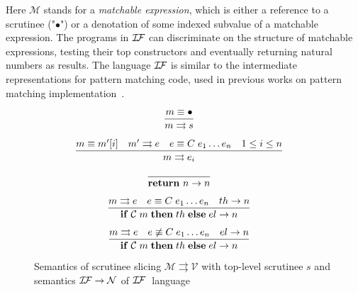  Here $\mathcal{M}$ stands for a \emph{matchable expression}, which is either a reference to a scrutinee ("$\bullet$") or
 a denotation of some indexed subvalue of a matchable expression. The programs in $\mathcal{I\!F}$ can discriminate on the
 structure of matchable expressions, testing their top constructors and eventually returning natural numbers as results.
 The language $\mathcal{I\!F}$ is similar to the intermediate representations for pattern matching code, used in 
 previous works on pattern matching implementation~\cite{maranget2001,maranget2008}.
 
 
 \begin{figure}
    \[
    \begin{array}{cr}
      \dfrac{m \equiv \bullet} { m \rightrightarrows s} & 
        \\[5mm]
      \dfrac{m \equiv m'[i]\quad m'\rightrightarrows e\quad e\equiv C\;e_1\dots e_n\quad 1\le i\le n} { m \rightrightarrows e_i} & 
        \\[5mm]
      \dfrac{}{\mathbf{return}\ n \rightarrow n} &       
        \\[5mm]
      \dfrac{m \rightrightarrows e \quad e\equiv C\; e_1\dots e_n\quad th \rightarrow n} {\mathbf{if}\;\mathcal{C}\;m \; \mathbf{then}\;th\;\mathbf{else}\;el \rightarrow n} &       
        \\[5mm]
      \dfrac{m \rightrightarrows e \quad e\not\equiv C\; e_1\dots e_n\quad el \rightarrow n} {\mathbf{if}\;\mathcal{C}\;m\;\mathbf{then}\;th\;\mathbf{else}\;el \rightarrow n} &       
    \end{array}
    \]
    \caption{Semantics of scrutinee slicing $\mathcal{M} \rightrightarrows \mathcal{V}$ with top-level scrutinee $s$ and semantics $\mathcal{I\!F}\rightarrow \mathcal{N}$  of $\mathcal{I\!F}\;$ language
    }
   \label{fig:ir}
 \end{figure}
 
